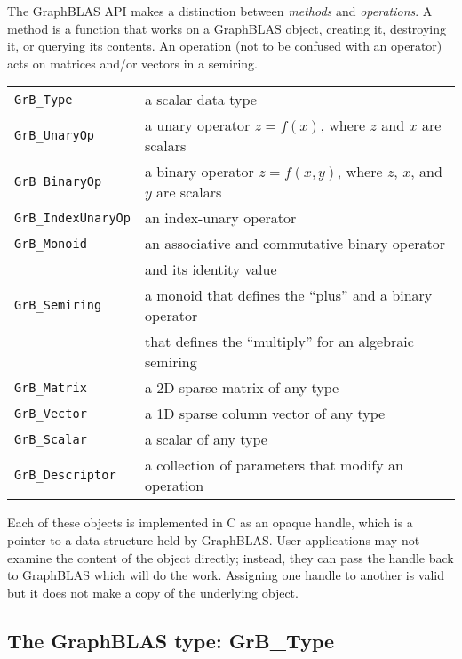 \documentclass[12pt]{article}
\begin{document}
The GraphBLAS API makes a distinction between {\em methods} and {\em
operations}.  A method is a function that works on a GraphBLAS object, creating
it, destroying it, or querying its contents.  An operation (not to be confused
with an operator) acts on matrices and/or vectors in a semiring.

\vspace{0.1in}
\noindent
{\small
\begin{tabular}{ll}
\hline
\verb'GrB_Type'      & a scalar data type \\
\verb'GrB_UnaryOp'   & a unary operator $z=f(x)$, where $z$ and $x$ are scalars\\
\verb'GrB_BinaryOp'  & a binary operator $z=f(x,y)$, where $z$, $x$, and $y$ are scalars\\
\verb'GrB_IndexUnaryOp'  & an index-unary operator \\
\verb'GrB_Monoid'    & an associative and commutative binary operator  \\
                     & and its identity value \\
\verb'GrB_Semiring'  & a monoid that defines the ``plus'' and a binary operator\\
                     & that defines the ``multiply'' for an algebraic semiring \\
\verb'GrB_Matrix'    & a 2D sparse matrix of any type \\
\verb'GrB_Vector'    & a 1D sparse column vector of any type \\
\verb'GrB_Scalar'    & a scalar of any type \\
\verb'GrB_Descriptor'& a collection of parameters that modify an operation \\
\hline
\end{tabular}
}
\vspace{0.1in}

Each of these objects is implemented in C as an opaque handle, which is a
pointer to a data structure held by GraphBLAS.  User applications may not
examine the content of the object directly; instead, they can pass the handle
back to GraphBLAS which will do the work.  Assigning one handle to another
is valid but it does not make a copy of the underlying object.

\newpage
\subsection{The GraphBLAS type: {\sf GrB\_Type}} %
\label{type}
\end{document}
